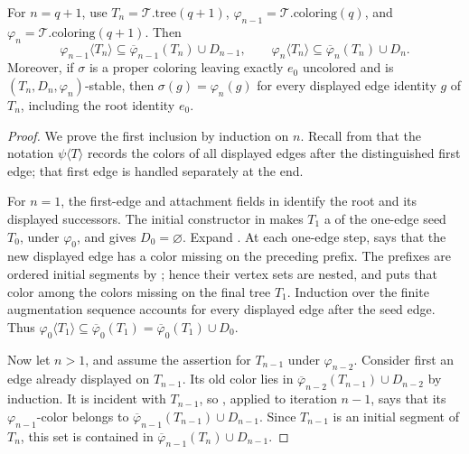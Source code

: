 \begin{lemma}
For \(n=q+1\), use
\(T_n=\mathcal T.\mathrm{tree}(q+1)\),
\(\varphi_{n-1}=\mathcal T.\mathrm{coloring}(q)\), and
\(\varphi_n=\mathcal T.\mathrm{coloring}(q+1)\).  Then
\[
 \varphi_{n-1}\langle T_n\rangle
   \subseteq\overline\varphi_{n-1}(T_n)\cup D_{n-1},
 \qquad
 \varphi_n\langle T_n\rangle
   \subseteq\overline\varphi_n(T_n)\cup D_n.
\]
Moreover, if \(\sigma\) is a proper coloring leaving exactly \(e_0\)
uncolored and is \((T_n,D_n,\varphi_n)\)-stable, then
\(\sigma(g)=\varphi_n(g)\) for every displayed edge identity \(g\) of
\(T_n\), including the root identity \(e_0\).
\end{lemma}
\begin{proof}
We prove the first inclusion by induction on \(n\).  Recall from
 that the notation
\(\psi\langle T\rangle\) records the colors of all displayed edges after
the distinguished first edge; that first edge is handled separately at
the end.

For \(n=1\), the first-edge and attachment fields in
 identify the root and its displayed successors.
The initial constructor in  makes \(T_1\) a
 of the one-edge seed \(T_0\), under
\(\varphi_0\), and gives \(D_0=\varnothing\).  Expand
.  At each one-edge step,
 says that the new displayed edge has a
color missing on the preceding prefix.  The prefixes are ordered initial
segments by ; hence their vertex sets
are nested, and  puts that color among the
colors missing on the final tree \(T_1\).  Induction over the finite
augmentation sequence accounts for every displayed edge after the seed
edge.  Thus
\(\varphi_0\langle T_1\rangle\subseteq
\overline\varphi_0(T_1)=\overline\varphi_0(T_1)\cup D_0\).

Now let \(n>1\), and assume the assertion for \(T_{n-1}\) under
\(\varphi_{n-2}\).  Consider first an edge already displayed on
\(T_{n-1}\).  Its old color lies in
\(\overline\varphi_{n-2}(T_{n-1})\cup D_{n-2}\) by induction.  It is
incident with \(T_{n-1}\), so
, applied to iteration \(n-1\), says
that its \(\varphi_{n-1}\)-color belongs to
\(\overline\varphi_{n-1}(T_{n-1})\cup D_{n-1}\).  Since
\(T_{n-1}\) is an initial segment of \(T_n\), this set is contained in
\(\overline\varphi_{n-1}(T_n)\cup D_{n-1}\).


\end{proof}
